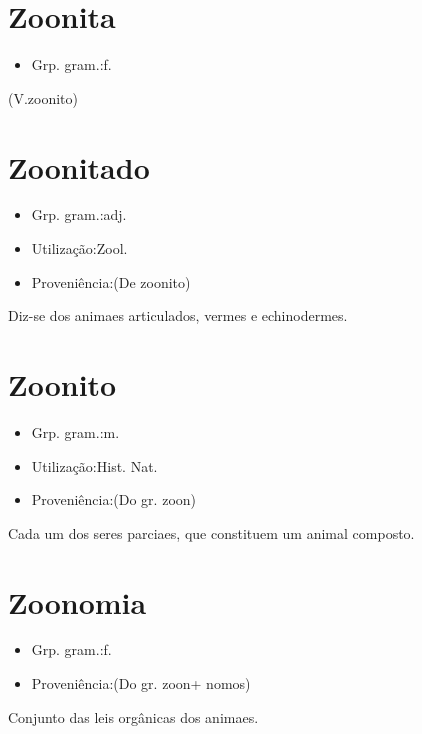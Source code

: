 \section{Zoonita}
\begin{itemize}
\item {Grp. gram.:f.}
\end{itemize}
(V.zoonito)
\section{Zoonitado}
\begin{itemize}
\item {Grp. gram.:adj.}
\end{itemize}
\begin{itemize}
\item {Utilização:Zool.}
\end{itemize}
\begin{itemize}
\item {Proveniência:(De \textunderscore zoonito\textunderscore )}
\end{itemize}
Diz-se dos animaes articulados, vermes e echinodermes.
\section{Zoonito}
\begin{itemize}
\item {Grp. gram.:m.}
\end{itemize}
\begin{itemize}
\item {Utilização:Hist. Nat.}
\end{itemize}
\begin{itemize}
\item {Proveniência:(Do gr. \textunderscore zoon\textunderscore )}
\end{itemize}
Cada um dos seres parciaes, que constituem um animal composto.
\section{Zoonomia}
\begin{itemize}
\item {Grp. gram.:f.}
\end{itemize}
\begin{itemize}
\item {Proveniência:(Do gr. \textunderscore zoon\textunderscore  + \textunderscore nomos\textunderscore )}
\end{itemize}
Conjunto das leis orgânicas dos animaes.

